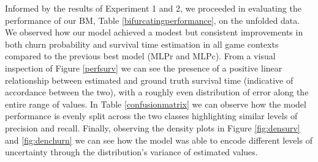 
Informed by the results of Experiment 1 and 2, we proceeded in evaluating the performance of our BM, Table \ref{bifurcatingperformance}, on the unfolded data. We observed how our model achieved a modest but consistent improvements in both churn probability and survival time estimation in all game contexts compared to the previous best model (MLPr and MLPc). From a visual inspection of Figure \ref{perfsurv} we can see the presence of a positive linear relationship between estimated and ground truth survival time (indicative of accordance between the two), with a roughly even distribution of error along the entire range of values. In Table \ref{confusionmatrix} we can observe how the model performance is evenly split across the two classes highlighting similar levels of precision and recall. Finally, observing the density plots in Figure \ref{fig:densurv} and \ref{fig:denchurn} we can see how the model was able to encode different levels of uncertainty through the distribution's variance of estimated values.


